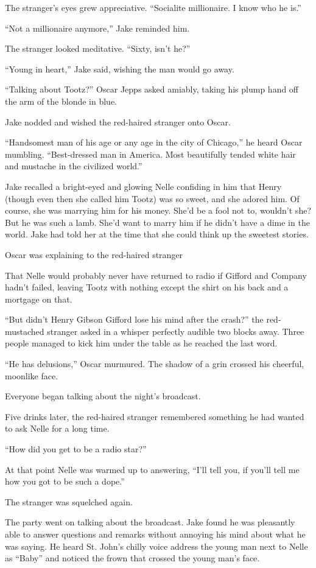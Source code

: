 \documentclass{novel}
\begin{document}
The stranger’s eyes grew appreciative. “Socialite millionaire. I know who he is.”

“Not a millionaire anymore,” Jake reminded him.

The stranger looked meditative. “Sixty, isn’t he?”

“Young in heart,” Jake said, wishing the man would go away.

“Talking about Tootz?” Oscar Jepps asked amiably, taking his plump hand off the arm of the blonde in blue.

Jake nodded and wished the red-haired stranger onto Oscar.

“Handsomest man of his age or any age in the city of Chicago,” he heard Oscar mumbling. “Best-dressed man in America. Most beautifully tended white hair and mustache in the civilized world.”

Jake recalled a bright-eyed and glowing Nelle confiding in him that Henry (though even then she called him Tootz) was so sweet, and she adored him. Of course, she was marrying him for his money. She’d be a fool not to, wouldn’t she? But he was such a lamb. She’d want to marry him if he didn’t have a dime in the world. Jake had told her at the time that she could think up the sweetest stories.

Oscar was explaining to the red-haired stranger

That Nelle would probably never have returned to radio if Gifford and Company hadn’t failed, leaving Tootz with nothing except the shirt on his back and a mortgage on that.

“But didn’t Henry Gibson Gifford lose his mind after the crash?” the red-mustached stranger asked in a whisper perfectly audible two blocks away. Three people managed to kick him under the table as he reached the last word.

“He has delusions,” Oscar murmured. The shadow of a grin crossed his cheerful, moonlike face.

Everyone began talking about the night’s broadcast.

Five drinks later, the red-haired stranger remembered something he had wanted to ask Nelle for a long time.

“How did you get to be a radio star?”

At that point Nelle was warmed up to answering, “I’ll tell you, if you’ll tell me how you got to be such a dope.”

The stranger was squelched again.

The party went on talking about the broadcast. Jake found he was pleasantly able to answer questions and remarks without annoying his mind about what he was saying. He heard St. John’s chilly voice address the young man next to Nelle as “Baby” and noticed the frown that crossed the young man’s face.
\end{document}
